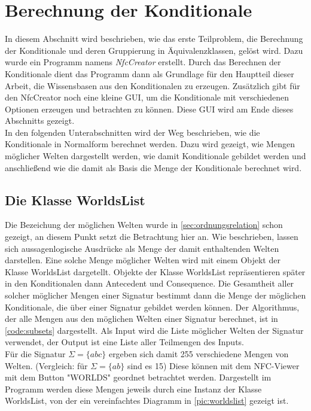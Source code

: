 \documentclass[12pt,a4paper]{article}
\begin{document}
\section{Berechnung der Konditionale}

In diesem Abschnitt wird beschrieben, wie das erste Teilproblem, die Berechnung der Konditionale und deren Gruppierung in Äquivalenzklassen, gelöst wird. Dazu wurde ein Programm namens \textit{NfcCreator} erstellt. Durch das Berechnen der Konditionale dient das Programm dann als Grundlage für den Hauptteil dieser Arbeit, die Wissensbasen aus den Konditionalen zu erzeugen. Zusätzlich gibt für den NfcCreator noch eine kleine GUI, um die Konditionale mit verschiedenen Optionen erzeugen und betrachten zu können. Diese GUI wird am Ende dieses Abschnitts gezeigt. \\
In den folgenden Unterabschnitten wird der Weg beschrieben, wie die Konditionale in Normalform berechnet werden. Dazu wird gezeigt, wie Mengen möglicher Welten dargestellt werden, wie damit Konditionale gebildet werden und anschließend wie die damit als Basis die Menge der Konditionale berechnet wird.



\subsection{Die Klasse WorldsList}
\label{sec:worldslist}
Die Bezeichung der möglichen Welten wurde in \autoref{sec:ordnungsrelation} schon gezeigt, an diesem Punkt setzt die Betrachtung hier an. Wie beschrieben, lassen sich aussagenlogische Ausdrücke als Menge der damit enthaltenden Welten darstellen. Eine solche Menge möglicher Welten wird mit einem Objekt der Klasse WorldsList dargetellt. Objekte der Klasse WorldsList repräsentieren später in den Konditionalen dann Antecedent und Consequence. Die Gesamtheit aller solcher möglicher Mengen einer Signatur bestimmt dann die Menge der möglichen Konditionale, die über einer Signatur gebildet werden können. Der Algorithmus, der alle Mengen aus den möglichen Welten einer Signatur berechnet, ist in \autoref{code:subsets} dargestellt. Als Input wird die Liste möglicher Welten der Signatur verwendet, der Output ist eine Liste aller Teilmengen des Inputs. \\
Für die Signatur $\Sigma = \{abc\}$ ergeben sich damit 255 verschiedene Mengen von Welten. (Vergleich: für $\Sigma=\{ab\}$ sind es 15) Diese können mit dem NFC-Viewer mit dem Button "WORLDS" \space geordnet betrachtet werden. Dargestellt im Programm werden diese Mengen jeweils durch eine Instanz der Klasse WorldsList, von der ein vereinfachtes Diagramm in \ref{pic:worldslist} gezeigt ist. 
\end{document}
